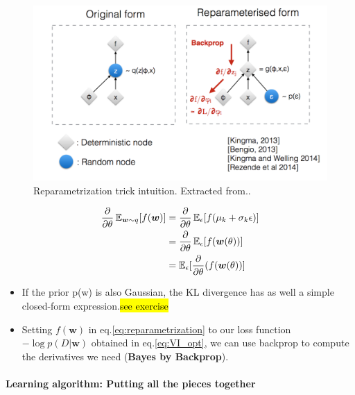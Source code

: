 \documentclass[main]{subfiles}
\begin{document}
\begin{figure}[H]
    	\centering
    	\includegraphics[width=0.9\linewidth]{05_LearningAsBayesianInference/figures/reparametrization.png}
    	\caption{Reparametrization trick intuition. Extracted from..} 
    	\label{fig:reparam_trick}
\end{figure}
    
\begin{equation}
    \begin{split}
        \frac{\partial}{\partial \theta} \operatorname{\mathbb{E}}_{\bm{w} \sim q} [f(\bm{w})] &= \frac{\partial}{\partial \theta} \operatorname{\mathbb{E}}_{\epsilon}[f(\mu_k + \sigma_k \epsilon)]\\
        &= \frac{\partial}{\partial \theta} \operatorname{\mathbb{E}}_{\epsilon} [f(\bm{w}(\theta))]\\
        &= \operatorname{\mathbb{E}}_{\epsilon}[\frac{\partial}{\partial \theta}(f(\bm{w}(\theta))]
    \end{split}
    \label{eq:reparametrization}
\end{equation}

\begin{itemize}
    \item If the prior p(w) is also Gaussian, the KL divergence has as well a simple closed-form expression.\hl{see exercise}
    \item Setting $ f(\bm{w})$ in eq.\ref{eq:reparametrization} to our loss function $-\log p(D | \bm{w})$ obtained in eq.\ref{eq:VI_opt}, we can use backprop to compute the derivatives we need (\textbf{Bayes by Backprop}).
\end{itemize}

\paragraph{Learning algorithm: Putting all the pieces together}\mbox{} \\
\end{document}

